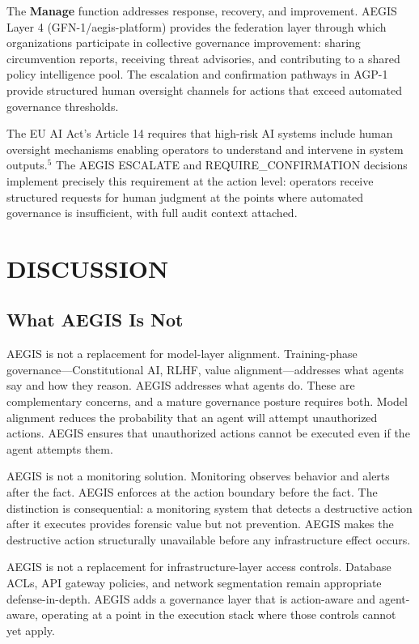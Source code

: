 \documentclass{IEEEcsmag}
\begin{document}
The {\bf Manage} function addresses response, recovery, and improvement. AEGIS Layer 4 (GFN-1/aegis-platform) provides the federation layer through which organizations participate in collective governance improvement: sharing circumvention reports, receiving threat advisories, and contributing to a shared policy intelligence pool. The escalation and confirmation pathways in AGP-1 provide structured human oversight channels for actions that exceed automated governance thresholds.

The EU AI Act's Article 14 requires that high-risk AI systems include human oversight mechanisms enabling operators to understand and intervene in system outputs.$^{5}$ The AEGIS ESCALATE and REQUIRE\_CONFIRMATION decisions implement precisely this requirement at the action level: operators receive structured requests for human judgment at the points where automated governance is insufficient, with full audit context attached.

\section{DISCUSSION}

\subsection{What AEGIS Is Not}

AEGIS is not a replacement for model-layer alignment. Training-phase governance---Constitutional AI, RLHF, value alignment---addresses what agents say and how they reason. AEGIS addresses what agents do. These are complementary concerns, and a mature governance posture requires both. Model alignment reduces the probability that an agent will attempt unauthorized actions. AEGIS ensures that unauthorized actions cannot be executed even if the agent attempts them.

AEGIS is not a monitoring solution. Monitoring observes behavior and alerts after the fact. AEGIS enforces at the action boundary before the fact. The distinction is consequential: a monitoring system that detects a destructive action after it executes provides forensic value but not prevention. AEGIS makes the destructive action structurally unavailable before any infrastructure effect occurs.

AEGIS is not a replacement for infrastructure-layer access controls. Database ACLs, API gateway policies, and network segmentation remain appropriate defense-in-depth. AEGIS adds a governance layer that is action-aware and agent-aware, operating at a point in the execution stack where those controls cannot yet apply.
\end{document}
